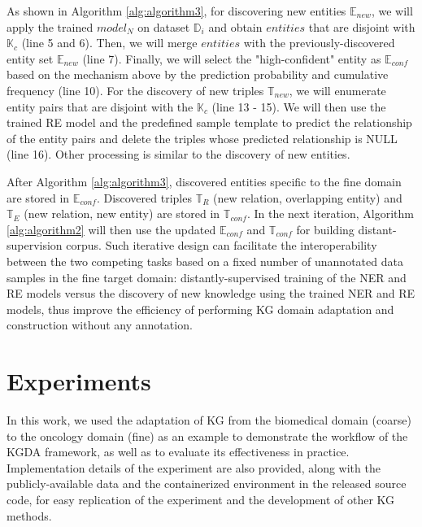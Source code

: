 \documentclass[sigconf]{acmart}
\begin{document}
As shown in Algorithm \ref{alg:algorithm3}, for discovering new entities $\mathbb{E}_{new}$, we will apply the trained $model_N$ on dataset $\mathbb{D}_i$ and obtain $entities$ that are disjoint with $\mathbb{K}_c$ (line 5 and 6). Then, we will merge $entities$ with the previously-discovered entity set $\mathbb{E}_{new}$ (line 7). Finally, we will select the "high-confident" entity as $\mathbb{E}_{conf}$ based on the mechanism above by the prediction probability and cumulative frequency (line 10). For the discovery of new triples $\mathbb{T}_{new}$, we will enumerate entity pairs that are disjoint with the $\mathbb{K}_c$ (line 13 - 15). We will then use the trained RE model and the predefined sample template to predict the relationship of the entity pairs and delete the triples whose predicted relationship is NULL (line 16). Other processing is similar to the discovery of new entities.

After Algorithm \ref{alg:algorithm3}, discovered entities specific to the fine domain are stored in $\mathbb{E}_{conf}$. Discovered triples $\mathbb{T}_R$ (new relation, overlapping entity) and $\mathbb{T}_E$ (new relation, new entity) are stored in $\mathbb{T}_{conf}$. In the next iteration, Algorithm \ref{alg:algorithm2} will then use the updated $\mathbb{E}_{conf}$ and $\mathbb{T}_{conf}$ for building distant-supervision corpus. Such iterative design can facilitate the interoperability between the two competing tasks based on a fixed number of unannotated data samples in the fine target domain: distantly-supervised training of the NER and RE models versus the discovery of new knowledge using the trained NER and RE models, thus improve the efficiency of performing KG domain adaptation and construction without any annotation. 






\section{Experiments}
In this work, we used the adaptation of KG from the biomedical domain (coarse) to the oncology domain (fine) as an example to demonstrate the workflow of the KGDA framework, as well as to evaluate its effectiveness in practice. Implementation details of the experiment are also provided, along with the publicly-available data and the containerized environment in the released source code, for easy replication of the experiment and the development of other KG methods. 
\end{document}
